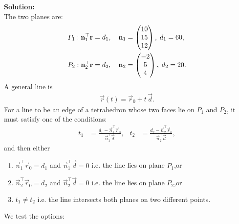 \documentclass[journal]{IEEEtran}
\begin{document}
\textbf{Solution:}\\
The two planes are:
\begin{align}
P_{1}:&\;\mathbf{n}_{1}^\top \mathbf{r} = d_{1}, 
\quad \mathbf{n}_{1} = \begin{pmatrix}10 \\ 15 \\ 12\end{pmatrix},\; d_{1} = 60,\\
P_{2}:&\;\mathbf{n}_{2}^\top \mathbf{r} = d_{2}, 
\quad \mathbf{n}_{2} = \begin{pmatrix}-2 \\ 5 \\ 4\end{pmatrix},\; d_{2} = 20.
\end{align}
A general line is
\begin{align}
\vec{r}(t) = \vec{r}_{0} + t\,\vec{d}.
\end{align}
For a line to be an edge of a tetrahedron whose two faces lie on $P_1$ and $P_2$, it must satisfy one of the conditions:
\begin{align}
t_1 &= \frac{d_1 - \vec{n}_1^\top\vec{r}_0}{\vec{n}_1^\top\vec{d}},&
t_2 &= \frac{d_2 - \vec{n}_2^\top\vec{r}_0}{\vec{n}_2^\top\vec{d}},
\end{align}
and then either
\begin{enumerate}
  \item $\vec{n}_1^\top\vec{r}_0=d_1$ and $\vec{n}_1^\top\vec{d}=0$ i.e. the line lies on plane $P_{1}$,or
  \item $\vec{n}_2^\top\vec{r}_0=d_2$ and $\vec{n}_2^\top\vec{d}=0$ i.e. the line lies on plane $P_{2}$,or
  \item $t_1\neq t_2$ i.e. the line intersects both planes on two different points.
\end{enumerate}
We test the options:
\end{document}
